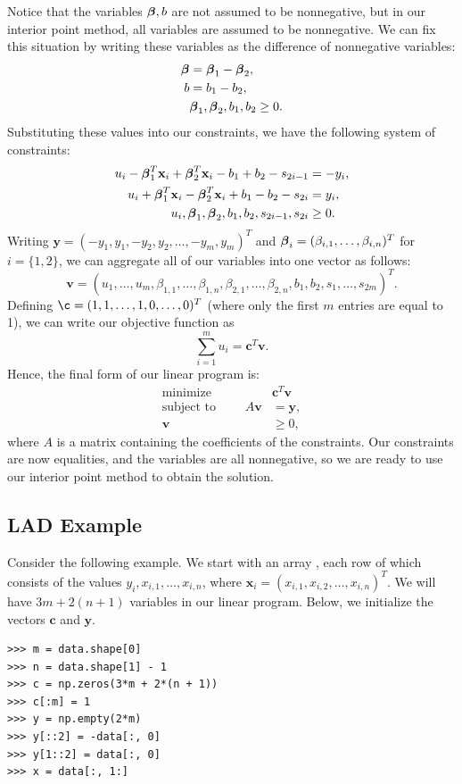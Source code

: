 Notice that the variables $\boldsymbol{\beta}, b$ are not assumed to be nonnegative, but in our interior point method, all variables are assumed to be nonnegative.
We can fix this situation by writing these variables as the difference of nonnegative variables:
\begin{align*}
  \boldsymbol{\beta} &= \boldsymbol{\beta}_1 - \boldsymbol{\beta}_2,\\
  b &= b_1 - b_2,\\
  &\boldsymbol{\beta}_1, \boldsymbol{\beta}_2, b_1, b_2 \geq 0.
\end{align*}
Substituting these values into our constraints, we have the following system of constraints:
\begin{align*}
u_i  - \boldsymbol{\beta}_1^T\mathbf{x}_i + \boldsymbol{\beta}_2^T\mathbf{x}_i - b_1 + b_2 - s_{2i-1}&= -y_i,\\
u_i + \boldsymbol{\beta}_1^T\mathbf{x}_i - \boldsymbol{\beta}_2^T\mathbf{x}_i + b_1 - b_2 - s_{2i}&= y_i,\\
u_i, \boldsymbol{\beta}_1, \boldsymbol{\beta}_2, b_1, b_2, s_{2i-1}, s_{2i}&\geq 0.
\end{align*}
Writing $\mathbf{y} = (-y_1, y_1, -y_2, y_2, \ldots, -y_m, y_m)^T$ and $\boldsymbol{\beta}_i = (\beta_{i,1}, \ldots, \beta_{i,n})^T$ for $i = \{1, 2\}$, we can aggregate all of our variables into one vector as follows:
\[
\mathbf{v} = (u_1,\ldots, u_m, \beta_{1,1},\ldots, \beta_{1,n}, \beta_{2,1},\ldots, \beta_{2,n}, b_1, b_2, s_1,\ldots,s_{2m})^T.
\]
Defining $\c = (1, 1, \ldots, 1, 0, \ldots, 0)^T$ (where only the first $m$ entries are equal to 1), we can write our objective function as
\[
\sum_{i=1}^m u_i = \mathbf{c}^T\mathbf{v}.
\]
Hence, the final form of our linear program is:
\begin{align*}
  \text{minimize }\qquad &\mathbf{c}^T\mathbf{v}\\
  \text{subject to }\qquad A\mathbf{v} &= \mathbf{y},\\
  \mathbf{v} &\geq 0,
\end{align*}
where $A$ is a matrix containing the coefficients of the constraints.
Our constraints are now equalities, and the variables are all nonnegative, so we are ready to use our interior point method to obtain the solution.

\subsection*{LAD Example}

Consider the following example.
We start with an array , each row of which consists of the values $y_i, x_{i,1},\ldots,x_{i,n}$, where $\mathbf{x}_i = (x_{i,1}, x_{i,2}, \ldots, x_{i,n})^T$.
We will have $3m + 2(n+1)$ variables in our linear program.
Below, we initialize the vectors $\mathbf{c}$ and $\mathbf{y}$.
\begin{lstlisting}
>>> m = data.shape[0]
>>> n = data.shape[1] - 1
>>> c = np.zeros(3*m + 2*(n + 1))
>>> c[:m] = 1
>>> y = np.empty(2*m)
>>> y[::2] = -data[:, 0]
>>> y[1::2] = data[:, 0]
>>> x = data[:, 1:]
\end{lstlisting}

